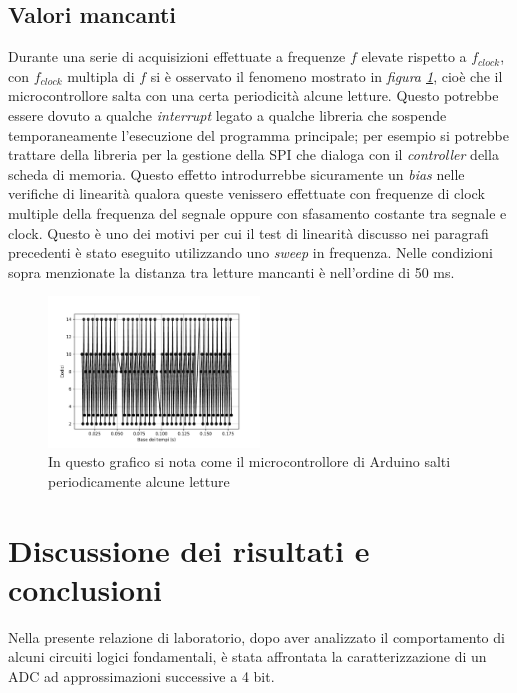 \documentclass[journal]{IEEEtran}
\begin{document}
\subsection{Valori mancanti}
Durante una serie di acquisizioni effettuate a frequenze $f$ elevate rispetto a $f_{clock}$, con $f_{clock}$ multipla di $f$ si è osservato il fenomeno mostrato in \textit{figura \ref{fig:missing}}, cioè che il microcontrollore salta con una certa periodicità alcune letture. Questo potrebbe essere dovuto a qualche \textit{interrupt} legato a qualche libreria che sospende temporaneamente l'esecuzione del programma principale; per esempio si potrebbe trattare della libreria per la gestione della SPI che dialoga con il \textit{controller} della scheda di memoria. Questo effetto introdurrebbe sicuramente un \textit{bias} nelle verifiche di linearità qualora queste venissero effettuate con frequenze di clock multiple della frequenza del segnale oppure con sfasamento costante tra segnale e clock. Questo è uno dei motivi per cui il test di linearità discusso nei paragrafi precedenti è stato eseguito utilizzando uno \textit{sweep} in frequenza. Nelle condizioni sopra menzionate la distanza tra letture mancanti è nell'ordine di 50 ms. 

\begin{figure}[H]%
\begin{center}
\includegraphics[width=0.50\textwidth]{analysis/output/letture_mancanti.pdf}
\caption{In questo grafico si nota come il microcontrollore di Arduino salti periodicamente alcune letture}
\label{fig:missing}
\end{center}
\end{figure}

\section{Discussione dei risultati e conclusioni}
Nella presente relazione di laboratorio, dopo aver analizzato il comportamento di alcuni circuiti logici fondamentali, è stata affrontata la caratterizzazione di un ADC ad approssimazioni successive a 4 bit. 
\\
\end{document}

